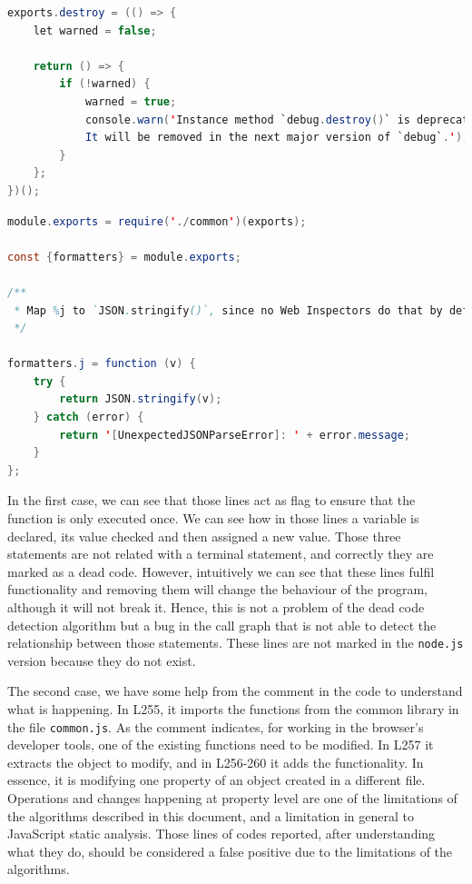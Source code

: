 \documentclass{uvamscse}
\begin{document}
\begin{lstlisting}[language=Java, firstnumber=12, caption=First fragment of code of \texttt{browser.js} marked as dead code]
exports.destroy = (() => {
	let warned = false;

	return () => {
		if (!warned) {
			warned = true;
			console.warn('Instance method `debug.destroy()` is deprecated and no longer does anything.
			It will be removed in the next major version of `debug`.');
		}
	};
})();
\end{lstlisting}

\begin{lstlisting}[language=Java, firstnumber=255, caption=Second fragment of code of \texttt{browser.js} marked as dead code]
module.exports = require('./common')(exports);

const {formatters} = module.exports;

/**
 * Map %j to `JSON.stringify()`, since no Web Inspectors do that by default.
 */

formatters.j = function (v) {
	try {
		return JSON.stringify(v);
	} catch (error) {
		return '[UnexpectedJSONParseError]: ' + error.message;
	}
};
\end{lstlisting}

In the first case, we can see that those lines act as flag to ensure that the function is only executed once. We can see how in those lines a variable is declared, its value checked and then assigned a new value. Those three statements are not related with a terminal statement, and correctly they are marked as a dead code. However, intuitively we can see that these lines fulfil functionality and removing them will change the behaviour of the program, although it will not break it. Hence, this is not a problem of the dead code detection algorithm but a bug in  the call graph that is not able to detect the relationship between those statements. These lines are not marked in the \texttt{node.js} version because they do not exist.

The second case, we have some help from the comment in the code to understand what is happening. In L255, it imports the functions from the common library in the file \texttt{common.js}. As the comment indicates, for working in the browser's developer tools, one of the existing functions need to be modified. In L257 it extracts the object to modify, and in L256-260 it adds the functionality. In essence, it is modifying one property of an object created in a different file. Operations and changes happening at property level are one of the limitations of the algorithms described in this document, and a limitation in general to JavaScript static analysis. Those lines of codes reported, after understanding what they do, should be considered a false positive due to the limitations of the algorithms.
\end{document}
